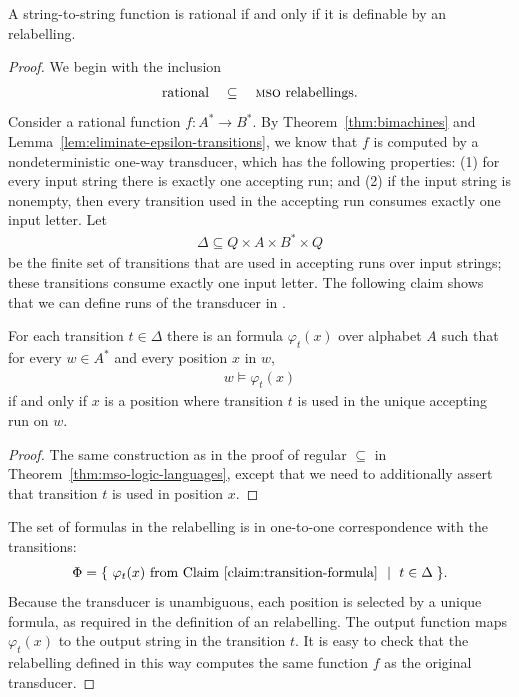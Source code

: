 \begin{theorem}
    \label{thm:logic-rational-functions}
    A string-to-string function is rational if and only if it is definable by an \mso relabelling.
\end{theorem}
\begin{proof}
    We begin with the inclusion 
    \begin{align*}
    \text{rational} \quad \subseteq \quad \text{\mso relabellings.}
    \end{align*}
    Consider a rational function $f : A^* \to B^*$. By Theorem~\ref{thm:bimachines} and Lemma~\ref{lem:eliminate-epsilon-transitions}, we  know that $f$  is computed by a nondeterministic one-way transducer, which has the following properties: (1) for every input string there is exactly one accepting run; and (2) if the input string is nonempty, then every transition used in the accepting run consumes exactly one input letter.  Let 
    \begin{align*}
    \Delta \subseteq Q \times A \times B^* \times Q
    \end{align*}
    be the finite set of  transitions that are used in accepting runs over input strings; these transitions consume exactly one input letter.  The following claim shows that we can define runs of the transducer in \mso.  
    \begin{claim}\label{claim:transition-formula}
        For each transition $t \in \Delta$ there is an \mso formula $\varphi_t(x)$ over alphabet $A$ such that for every $w \in A^*$ and every position $x$ in $w$, 
    \begin{align*}
    w \models \varphi_t(x)
    \end{align*}
     if and only if $x$ is a position where transition $t$ is used in the unique accepting run on $w$. 
    \end{claim}
    \begin{proof}
        The same construction as in the proof of regular $\subseteq$ \mso in Theorem~\ref{thm:mso-logic-languages}, except that we need to additionally assert that transition $t$ is used in position $x$.
    \end{proof}
    The set of formulas in the \mso relabelling is in one-to-one correspondence with the transitions:
\begin{align*}
\Phi = \setbuild{\varphi_t(x) \text{ from Claim~\ref{claim:transition-formula} }}{$t \in \Delta$}.
\end{align*}
Because the transducer is unambiguous, each position is selected by a unique formula, as required in the definition of an \mso relabelling. The output function maps $\varphi_t(x)$ to the output string in the transition $t$. It is easy to check that the \mso relabelling defined in this way computes the same function $f$ as the original transducer.


\end{proof}
